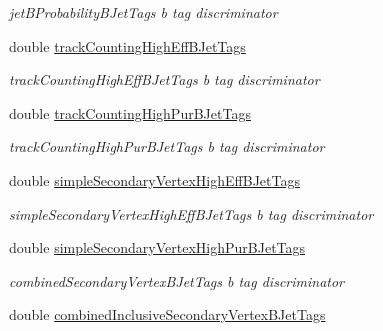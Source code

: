 \begin{DoxyCompactItemize}
\begin{DoxyCompactList}\small\item\em jet\-B\-Probability\-B\-Jet\-Tags b tag discriminator \end{DoxyCompactList}\item 
\hypertarget{structran_1_1JetStruct_ae56ed74e0854b7ba96bb58aee24e3c37}{double \hyperlink{structran_1_1JetStruct_ae56ed74e0854b7ba96bb58aee24e3c37}{track\-Counting\-High\-Eff\-B\-Jet\-Tags}}\label{structran_1_1JetStruct_ae56ed74e0854b7ba96bb58aee24e3c37}

\begin{DoxyCompactList}\small\item\em track\-Counting\-High\-Eff\-B\-Jet\-Tags b tag discriminator \end{DoxyCompactList}\item 
\hypertarget{structran_1_1JetStruct_ad1c745b77d4cca7b28b2d2df36fec075}{double \hyperlink{structran_1_1JetStruct_ad1c745b77d4cca7b28b2d2df36fec075}{track\-Counting\-High\-Pur\-B\-Jet\-Tags}}\label{structran_1_1JetStruct_ad1c745b77d4cca7b28b2d2df36fec075}

\begin{DoxyCompactList}\small\item\em track\-Counting\-High\-Pur\-B\-Jet\-Tags b tag discriminator \end{DoxyCompactList}\item 
\hypertarget{structran_1_1JetStruct_a96b9bfecc789790ee654d542efbc0d6b}{double \hyperlink{structran_1_1JetStruct_a96b9bfecc789790ee654d542efbc0d6b}{simple\-Secondary\-Vertex\-High\-Eff\-B\-Jet\-Tags}}\label{structran_1_1JetStruct_a96b9bfecc789790ee654d542efbc0d6b}

\begin{DoxyCompactList}\small\item\em simple\-Secondary\-Vertex\-High\-Eff\-B\-Jet\-Tags b tag discriminator \end{DoxyCompactList}\item 
\hypertarget{structran_1_1JetStruct_a76534a95f4373c87ca6b70f8e65965e1}{double \hyperlink{structran_1_1JetStruct_a76534a95f4373c87ca6b70f8e65965e1}{simple\-Secondary\-Vertex\-High\-Pur\-B\-Jet\-Tags}}\label{structran_1_1JetStruct_a76534a95f4373c87ca6b70f8e65965e1}

\begin{DoxyCompactList}\small\item\em combined\-Secondary\-Vertex\-B\-Jet\-Tags b tag discriminator \end{DoxyCompactList}\item 
\hypertarget{structran_1_1JetStruct_a78ad7fb27ed4e35314273a3e7b54fd84}{double \hyperlink{structran_1_1JetStruct_a78ad7fb27ed4e35314273a3e7b54fd84}{combined\-Inclusive\-Secondary\-Vertex\-B\-Jet\-Tags}}\label{structran_1_1JetStruct_a78ad7fb27ed4e35314273a3e7b54fd84}


\end{DoxyCompactItemize}
